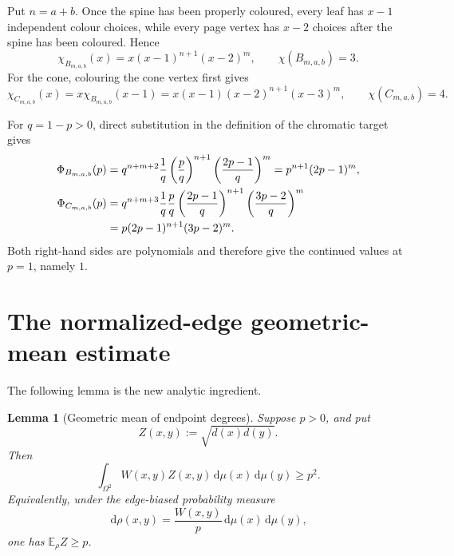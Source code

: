 \documentclass[11pt]{article}
\newtheorem{lemma}[theorem]{Lemma}
\newcommand{\dd}{\,\mathrm{d}}
\begin{document}
Put $n=a+b$.  Once the spine has been properly coloured, every leaf has
$x-1$ independent colour choices, while every page vertex has $x-2$
choices after the spine has been coloured.  Hence
\begin{equation}
 \chi_{B_{m,a,b}}(x)=x(x-1)^{n+1}(x-2)^m,
 \qquad
 \chi(B_{m,a,b})=3.
 \label{eq:base-chromatic}
\end{equation}
For the cone, colouring the cone vertex first gives
\begin{equation}
 \chi_{C_{m,a,b}}(x)
 =x\chi_{B_{m,a,b}}(x-1)
 =x(x-1)(x-2)^{n+1}(x-3)^m,
 \qquad
 \chi(C_{m,a,b})=4.
 \label{eq:cone-chromatic}
\end{equation}

For $q=1-p>0$, direct substitution in the definition of the chromatic
target gives
\begin{align}
 \Phi_{B_{m,a,b}}(p)
 &=q^{n+m+2}\frac1q
   \left(\frac pq\right)^{n+1}
   \left(\frac{2p-1}{q}\right)^m
 =p^{n+1}(2p-1)^m,
 \label{eq:base-target}
 \\
 \Phi_{C_{m,a,b}}(p)
 &=q^{n+m+3}\frac1q\frac pq
   \left(\frac{2p-1}{q}\right)^{n+1}
   \left(\frac{3p-2}{q}\right)^m
 \notag\\
 &=p(2p-1)^{n+1}(3p-2)^m.
 \label{eq:cone-target}
\end{align}
Both right-hand sides are polynomials and therefore give the continued
values at $p=1$, namely $1$.


\section{The normalized-edge geometric-mean estimate}

The following lemma is the new analytic ingredient.

\begin{lemma}[Geometric mean of endpoint degrees]
\label{lem:edge-geometric-mean}
Suppose $p>0$, and put
\[
 Z(x,y):=\sqrt{d(x)d(y)}.
\]
Then
\begin{equation}
 \int_{\Omega^2}W(x,y)Z(x,y)\dd\mu(x)\dd\mu(y)\geq p^2.
 \label{eq:geometric-mean}
\end{equation}
Equivalently, under the edge-biased probability measure
\[
 \dd\rho(x,y)=\frac{W(x,y)}p\dd\mu(x)\dd\mu(y),
\]
one has $\mathbb E_\rho Z\geq p$.
\end{lemma}
\end{document}
